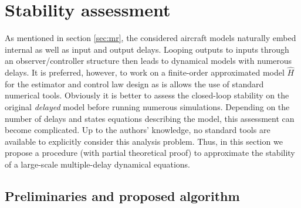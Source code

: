\documentclass[graybox]{svmult}
\begin{document}
\section{Stability assessment}\label{sec:st}

As mentioned in section \ref{sec:mr}, the considered aircraft models naturally embed internal as well as input and output delays. Looping outputs to inputs through an observer/controller structure then leads to dynamical models with  numerous delays. It is preferred, however, to work on a finite-order approximated model $\hat H$ for the estimator and control law design as is allows the use of standard numerical tools. Obviously it is better to assess the closed-loop stability on the original \textit{delayed} model before running numerous simulations.
Depending on the number of delays and states equations describing the model, this assessment can become complicated. Up to the authors' knowledge, no  standard tools are available to explicitly consider this analysis problem. Thus, in this section we propose a procedure (with partial theoretical proof) to approximate the stability of a large-scale multiple-delay dynamical equations. 

\subsection{Preliminaries and proposed algorithm }
\end{document}
